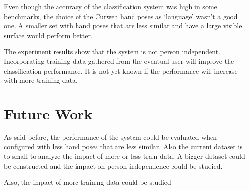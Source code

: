 Even though the accuracy of the classification system was high in some benchmarks, the choice of the Curwen hand poses as `language' wasn't a good one. A smaller set with hand poses that are less similar and have a large visible surface would perform better.

The experiment results show that the system is not person independent. Incorporating training data gathered from the eventual user will improve the classification performance. It is not yet known if the performance will increase with more training data.

\section{Future Work}
As said before, the performance of the system could be evaluated when configured with less hand poses that are less similar. Also the current dataset is to small to analyze the impact of more or less train data. A bigger dataset could be constructed and the impact on person independence could be studied.



Also, the impact of more training data could be studied.